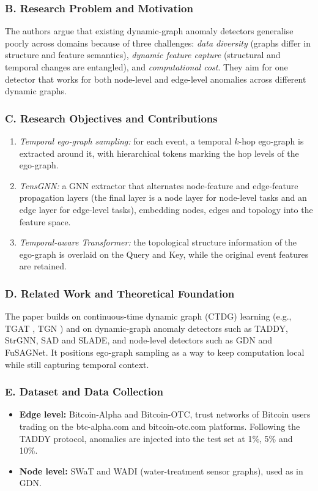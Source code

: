 \documentclass[11pt,a4paper]{article}
\begin{document}
\subsubsection*{B. Research Problem and Motivation}
The authors argue that existing dynamic-graph anomaly detectors generalise poorly across domains because of three challenges: \textit{data diversity} (graphs differ in structure and feature semantics), \textit{dynamic feature capture} (structural and temporal changes are entangled), and \textit{computational cost}. They aim for one detector that works for both node-level and edge-level anomalies across different dynamic graphs.

\subsubsection*{C. Research Objectives and Contributions}
\begin{enumerate}[leftmargin=*]
    \item \textit{Temporal ego-graph sampling:} for each event, a temporal $k$-hop ego-graph is extracted around it, with hierarchical tokens marking the hop levels of the ego-graph.
    \item \textit{TensGNN:} a GNN extractor that alternates node-feature and edge-feature propagation layers (the final layer is a node layer for node-level tasks and an edge layer for edge-level tasks), embedding nodes, edges and topology into the feature space.
    \item \textit{Temporal-aware Transformer:} the topological structure information of the ego-graph is overlaid on the Query and Key, while the original event features are retained.
\end{enumerate}

\subsubsection*{D. Related Work and Theoretical Foundation}
The paper builds on continuous-time dynamic graph (CTDG) learning (e.g., TGAT \cite{xu2020tgat}, TGN \cite{rossi2020tgn}) and on dynamic-graph anomaly detectors such as TADDY, StrGNN, SAD and SLADE, and node-level detectors such as GDN and FuSAGNet. It positions ego-graph sampling as a way to keep computation local while still capturing temporal context.

\subsubsection*{E. Dataset and Data Collection}
\begin{itemize}[leftmargin=*]
    \item \textbf{Edge level:} Bitcoin-Alpha and Bitcoin-OTC, trust networks of Bitcoin users trading on the btc-alpha.com and bitcoin-otc.com platforms. Following the TADDY protocol, anomalies are injected into the test set at 1\%, 5\% and 10\%.
    \item \textbf{Node level:} SWaT and WADI (water-treatment sensor graphs), used as in GDN.
\end{itemize}
\end{document}
